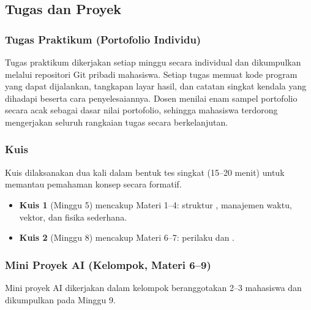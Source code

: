 \subsection{Tugas dan Proyek}

\subsubsection{Tugas Praktikum (Portofolio Individu)}

Tugas praktikum dikerjakan setiap minggu secara individual dan dikumpulkan
melalui repositori Git pribadi mahasiswa. Setiap tugas memuat kode program yang
dapat dijalankan, tangkapan layar hasil, dan catatan singkat kendala yang
dihadapi beserta cara penyelesaiannya. Dosen menilai enam sampel portofolio
secara acak sebagai dasar nilai portofolio, sehingga mahasiswa terdorong
mengerjakan seluruh rangkaian tugas secara berkelanjutan.

\subsubsection{Kuis}

Kuis dilaksanakan dua kali dalam bentuk tes singkat (15--20 menit) untuk
memantau pemahaman konsep secara formatif.

\begin{itemize}
  \item \textbf{Kuis 1} (Minggu 5) mencakup Materi 1--4: struktur , manajemen waktu, vektor, dan fisika sederhana.
  \item \textbf{Kuis 2} (Minggu 8) mencakup Materi 6--7: perilaku  dan .
\end{itemize}

\subsubsection{Mini Proyek AI (Kelompok, Materi 6--9)}

Mini proyek AI dikerjakan dalam kelompok beranggotakan 2--3 mahasiswa dan
dikumpulkan pada Minggu 9.


